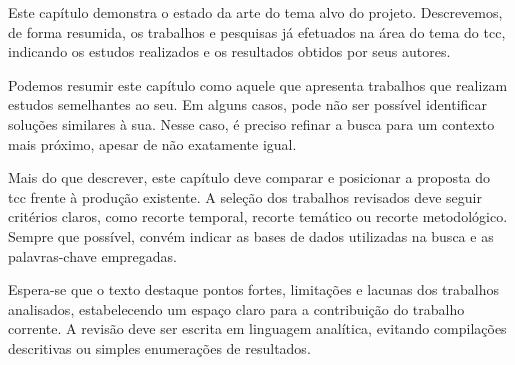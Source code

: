 \documentclass{eic-bcc-tcc}
\begin{document}
Este capítulo demonstra o estado da arte do tema alvo do projeto. Descrevemos, de forma resumida, os trabalhos e pesquisas já efetuados na área do tema do \gls{tcc}, indicando os estudos realizados e os resultados obtidos por seus autores.

Podemos resumir este capítulo como aquele que apresenta trabalhos que realizam estudos semelhantes ao seu. Em alguns casos, pode não ser possível identificar soluções similares à sua. Nesse caso, é preciso refinar a busca para um contexto mais próximo, apesar de não exatamente igual.

Mais do que descrever, este capítulo deve comparar e posicionar a proposta do \gls{tcc} frente à produção existente. A seleção dos trabalhos revisados deve seguir critérios claros, como recorte temporal, recorte temático ou recorte metodológico. Sempre que possível, convém indicar as bases de dados utilizadas na busca e as palavras-chave empregadas.

Espera-se que o texto destaque pontos fortes, limitações e lacunas dos trabalhos analisados, estabelecendo um espaço claro para a contribuição do trabalho corrente. A revisão deve ser escrita em linguagem analítica, evitando compilações descritivas ou simples enumerações de resultados.
\end{document}
